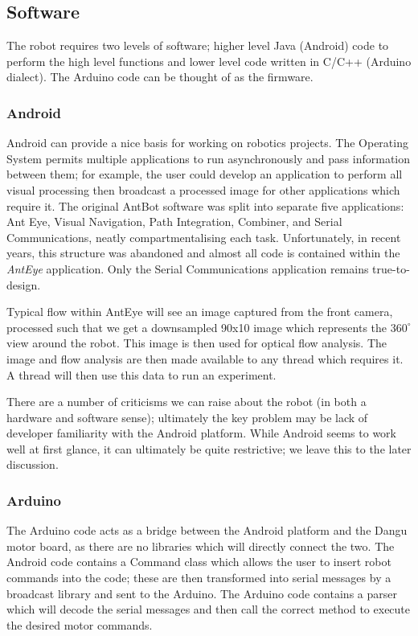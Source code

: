 \documentclass[a4paper,11pt,twoside,openright]{article}
\begin{document}
\subsection{ Software }
The robot requires two levels of software; higher level Java (Android) code to
perform the high level functions and lower level code written in C/C++
(Arduino dialect). The Arduino code can be thought of as the firmware.

\subsubsection{ Android } \label{subsubsec:droid}
Android can provide a nice basis for working on robotics projects. The
Operating System permits multiple applications to run asynchronously and
pass information between them; for example, the user could develop an application
to perform all visual processing then broadcast a processed image for other
applications which require it. The original AntBot software was split into
separate five applications: Ant Eye, Visual Navigation, Path Integration,
Combiner, and Serial Communications, neatly compartmentalising each task.
Unfortunately, in recent years, this structure was abandoned and almost all code
is contained within the \textit{AntEye} application. Only the Serial
Communications application remains true-to-design.
\newline
\par

Typical flow within AntEye will see an image captured from the front camera,
processed such that we get a downsampled 90x10 image which represents the
$360^{\circ}$ view around the robot. This image is then used for optical
flow analysis. The image and flow analysis are then made available to any thread
which requires it. A thread will then use this data to run an experiment.
\newline
\par

There are a number of criticisms we can raise about the robot (in both a hardware
and software sense); ultimately the key problem may be lack of developer
familiarity with the Android platform.  While Android seems to work well at
first glance, it can ultimately be quite restrictive; we leave this to the
later discussion.

\subsubsection{ Arduino }
The Arduino code acts as a bridge between the Android platform and the Dangu
motor board, as there are no libraries which will directly connect the two.
The Android code contains a Command class which allows the user to insert robot
commands into the code; these are then transformed into serial messages by a
broadcast library \cite{Eberding2016} and sent to the Arduino. The Arduino code
contains a parser which will decode the serial messages and then call the
correct method to execute the desired motor commands.
\end{document}
